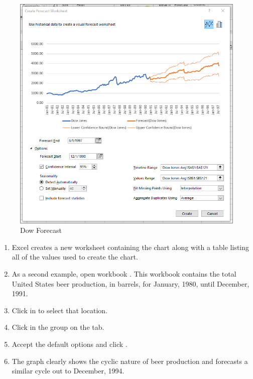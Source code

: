 \begin{figure}[H]
	\centering
	\includegraphics[width=\maxwidth{.95\linewidth}]{gfx/ch08_fig13}
	\caption{Dow Forecast}
	\label{08:fig13}
\end{figure}

\begin{enumerate}[resume]
	\item Excel creates a new worksheet containing the chart along with a table listing all of the values used to create the chart.
	\item As a second example, open workbook . This workbook contains the total United States beer production, in barrels, for January, 1980, until December, 1991. 
	\item Click in  to select that location.
	\item Click  in the  group on the  tab.
	\item Accept the default options and click .
	\item The graph clearly shows the cyclic nature of beer production and forecasts a similar cycle out to December, 1994.
\end{enumerate}

